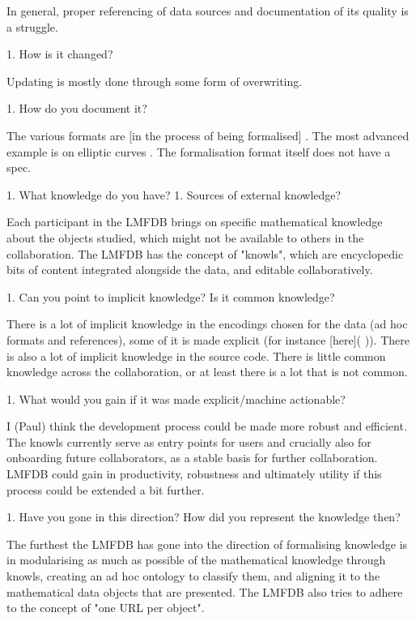 \documentclass{deliverablereport}
\begin{document}
    In general, proper referencing of data sources and documentation of its quality is a struggle.

 1. How is it changed?

   Updating is mostly done through some form of overwriting.

 1. How do you document it?

   The various formats are [in the process of being formalised]
   . The most advanced example is on elliptic curves
   . The formalisation format itself does not have a spec.

1. What knowledge do you have?
 1. Sources of external knowledge?

   Each participant in the LMFDB brings on specific mathematical knowledge about the objects studied, which might not be available to others in the collaboration. The LMFDB has the concept of "knowls", which are encyclopedic bits of content integrated alongside the data, and editable collaboratively.

 1. Can you point to implicit knowledge? Is it common knowledge?

   There is a lot of implicit knowledge in the encodings chosen for the data (ad hoc formats and references), some of it is made explicit (for instance [here](
   )). There is also a lot of implicit knowledge in the source code. There is little common knowledge across the collaboration, or at least there is a lot that is not common.

 1. What would you gain if it was made explicit/machine actionable?

   I (Paul) think the development process could be made more robust and efficient. The knowls currently serve as entry points for users and crucially also for onboarding future collaborators, as a stable basis for further collaboration. LMFDB could gain in productivity, robustness and ultimately utility if this process could be extended a bit further.

 1. Have you gone in this direction? How did you represent the knowledge then?

   The furthest the LMFDB has gone into the direction of formalising knowledge is in modularising as much as possible of the mathematical knowledge through knowls, creating an ad hoc ontology to classify them, and aligning it to the mathematical data objects that are presented. The LMFDB also tries to adhere to the concept of "one URL per object".
\end{document}
